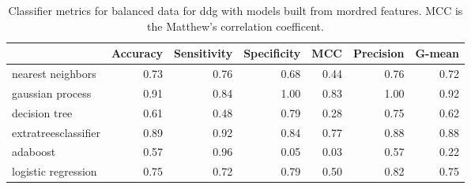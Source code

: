 \begin{table}[H]
\centering
\caption{Classifier metrics for balanced data for ddg with models built from mordred features. MCC is the Matthew’s correlation coefficent.}
\label{tbl:mordred_features}
\begin{tabular}{lrrrrrr}
\toprule
{} &  Accuracy &  Sensitivity &  Specificity &  MCC &  Precision &  G-mean \\
\midrule
nearest neighbors    &      0.73 &         0.76 &         0.68 & 0.44 &       0.76 &    0.72 \\
gaussian process     &      0.91 &         0.84 &         1.00 & 0.83 &       1.00 &    0.92 \\
decision tree        &      0.61 &         0.48 &         0.79 & 0.28 &       0.75 &    0.62 \\
extratreesclassifier &      0.89 &         0.92 &         0.84 & 0.77 &       0.88 &    0.88 \\
adaboost             &      0.57 &         0.96 &         0.05 & 0.03 &       0.57 &    0.22 \\
logistic regression  &      0.75 &         0.72 &         0.79 & 0.50 &       0.82 &    0.75 \\
\bottomrule
\end{tabular}
\end{table}
